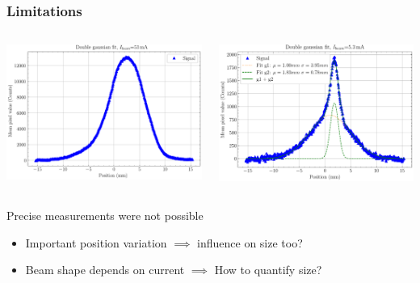 \begin{frame}
  \frametitle{Limitations}
  \begin{columns}[T]
    \begin{column}{0.45\textwidth}
      \includegraphics[width=1\textwidth]{04_Test/fig/fig000_ex_beam_profile_a}
    \end{column}
    \begin{column}{0.45\textwidth}
      \includegraphics[width=1\textwidth]{04_Test/fig/fig000_ex_beam_profile_b2}
    \end{column}
  \end{columns}
  \begin{alertblock}{Precise measurements were not possible}
    \begin{itemize}
      \item Important position variation $\implies$ influence on size too?
      \item Beam shape depends on current $\implies$ How to quantify size?
    \end{itemize}
  \end{alertblock}
\end{frame}

